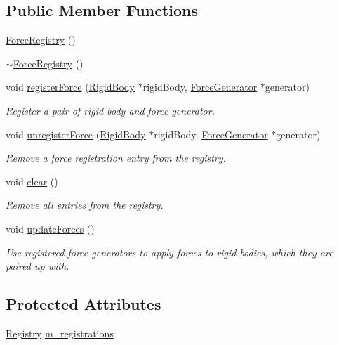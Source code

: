 \subsection*{Public Member Functions}
\begin{DoxyCompactItemize}
\item 
\mbox{\hyperlink{classr3_1_1_force_registry_a6830132c53a756ebf3e6621195f51b17}{Force\+Registry}} ()
\item 
\mbox{\hyperlink{classr3_1_1_force_registry_a322cdf54468a6f59610562a7bfc2e60d}{$\sim$\+Force\+Registry}} ()
\item 
void \mbox{\hyperlink{classr3_1_1_force_registry_a18e3bee47d4510cc91426103042b382c}{register\+Force}} (\mbox{\hyperlink{classr3_1_1_rigid_body}{Rigid\+Body}} $\ast$rigid\+Body, \mbox{\hyperlink{classr3_1_1_force_generator}{Force\+Generator}} $\ast$generator)
\begin{DoxyCompactList}\small\item\em Register a pair of rigid body and force generator. \end{DoxyCompactList}\item 
void \mbox{\hyperlink{classr3_1_1_force_registry_a8fcc46a35435ffb74c471a0a5ff36a7f}{unregister\+Force}} (\mbox{\hyperlink{classr3_1_1_rigid_body}{Rigid\+Body}} $\ast$rigid\+Body, \mbox{\hyperlink{classr3_1_1_force_generator}{Force\+Generator}} $\ast$generator)
\begin{DoxyCompactList}\small\item\em Remove a force registration entry from the registry. \end{DoxyCompactList}\item 
void \mbox{\hyperlink{classr3_1_1_force_registry_ab1c31bc403d998af16df97ff5d42c95f}{clear}} ()
\begin{DoxyCompactList}\small\item\em Remove all entries from the registry. \end{DoxyCompactList}\item 
void \mbox{\hyperlink{classr3_1_1_force_registry_a468b4b100cd4351039edc68b9f7145ab}{update\+Forces}} ()
\begin{DoxyCompactList}\small\item\em Use registered force generators to apply forces to rigid bodies, which they are paired up with. \end{DoxyCompactList}\end{DoxyCompactItemize}
\subsection*{Protected Attributes}
\begin{DoxyCompactItemize}
\item 
\mbox{\hyperlink{classr3_1_1_force_registry_a91449a71b1a33d773ef787ae56ae9b2d}{Registry}} \mbox{\hyperlink{classr3_1_1_force_registry_a36847da26301dc4b18e6b6b25fb2fa51}{m\+\_\+registrations}}
\end{DoxyCompactItemize}


